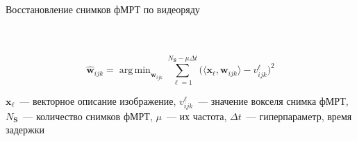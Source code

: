 \documentclass[10pt]{beamer}
\DeclareMathOperator*{\argmin}{arg\,min}  %
\begin{document}
\begin{frame}{Восстановление снимков фМРТ по видеоряду}
\begin{columns}[c]
\begin{figure}[h!]
            \hfill
        \end{figure}
\end{columns}

\[ \hat{\mathbf{w}}_{ijk} = \argmin_{\mathbf{w}_{ijk}} \sum\limits_{\ell = 1}^{N_{\mathbf{S}} - \mu \Delta t} \big( \langle \mathbf{x}_{\ell}, \mathbf{w}_{ijk} \rangle - v^{\ell}_{ijk} \big)^2 \]

\vspace{-0.1cm}

$\mathbf{x}_{\ell}$~--- векторное описание изображение, $v^{\ell}_{ijk}$~--- значение вокселя снимка фМРТ,
$N_{\mathbf{S}}$~--- количество снимков фМРТ, $\mu$~--- их частота, 
$\Delta t$~--- гиперпараметр, время задержки

\end{frame}
\end{document}
